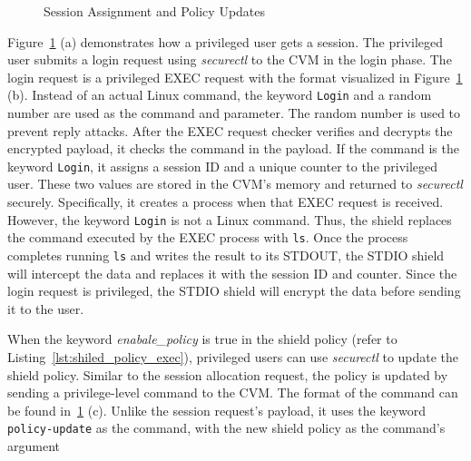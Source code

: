 \begin{figure}[!htb]
\begin{minipage}{0.9\textwidth}
\begin{subcolumns}[0.62\textwidth]
    \nextsubfigure
    \end{subcolumns}
    \end{minipage}
    
    \caption[Session Assignment and Policy Updates]{Session Assignment and Policy Updates}
    \label{fig:session_policy}
\end{figure}


Figure~\ref{fig:session_policy} (a) demonstrates how a privileged user gets a session. The privileged user submits a login request using \emph{securectl} to the \acrshort{CVM} in the login phase. The login request is a privileged EXEC request with the format visualized in Figure~\ref{fig:session_policy} (b). Instead of an actual Linux command, the keyword \texttt{Login} and a random number 
are used as the command and parameter. The random number is used to prevent reply attacks. After the EXEC request checker verifies and decrypts the encrypted payload, it checks the command in the payload. If the command is the keyword \texttt{Login}, it assigns a session ID and a unique counter to the privileged user. 
These two values are stored in the \acrshort{CVM}'s memory and returned to \emph{securectl} securely. Specifically, it creates a process when that EXEC request is received. However, the keyword \texttt{Login} is not a Linux command. Thus, the shield replaces the command executed by the EXEC process 
with \texttt{ls}. Once the process 
completes running \texttt{ls} and writes the result to its STDOUT, the STDIO shield will intercept the data and replaces it with the session ID and counter. Since the login request is privileged, the STDIO shield will encrypt the data before sending it to the user. 

When the keyword \emph{enabale\_policy} is true in the shield policy (refer to Listing~\ref{lst:shiled_policy_exec}), privileged users can use \emph{securectl} to update the shield policy. Similar to the session allocation request, the policy is updated by sending a privilege-level command to the \acrshort{CVM}. The format of the command can be found 
in~\ref{fig:session_policy} (c). Unlike the session request's payload, it uses the keyword \texttt{policy-update} as the command, with the new shield policy as the command's argument

